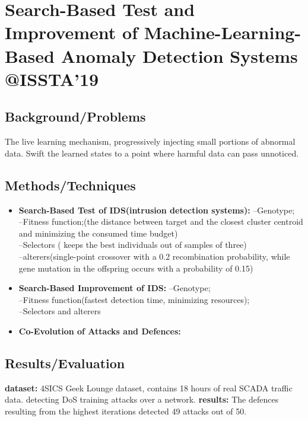 \section{Search-Based Test and Improvement of Machine-Learning-Based Anomaly Detection Systems \\@ISSTA'19}
\subsection{Background/Problems}
The live learning mechanism, progressively injecting small portions of abnormal data. Swift the learned states to a point where harmful data can pass unnoticed.
\subsection{Methods/Techniques}
\begin{itemize}
	\item \textbf{Search-Based Test of IDS(intrusion detection systems):}
          --Genotype;\\
          --Fitness function;(the distance between target and the closest cluster centroid and minimizing the consumed time budget)\\
         --Selectors ( keeps the best individuals out of samples of three)\\
         --alterers(single-point crossover with a 0.2 recombination probability, while gene mutation in the offspring occurs with a probability of 0.15)
	\item \textbf{Search-Based Improvement of IDS:}
          --Genotype;\\
          --Fitness function(fastest detection time, minimizing resources);\\
          --Selectors and alterers
	\item \textbf{Co-Evolution of Attacks and Defences:}	  
\end{itemize}

\subsection{Results/Evaluation}
\textbf{dataset:} 4SICS Geek Lounge dataset, contains 18 hours of real SCADA traffic data. detecting DoS training attacks over a network.
\textbf{results:} The defences resulting from the highest iterations detected 49 attacks out of 50.
